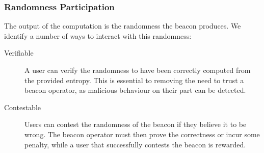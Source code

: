 \subsubsection{Randomness Participation}
The output of the computation is the randomness the beacon produces. We identify a number of ways to interact with this randomness:
\begin{description}
    \item [Verifiable] A user can verify the randomness to have been correctly computed from the provided entropy. This is essential to removing the need to trust a beacon operator, as malicious behaviour on their part can be detected. 
    \item [Contestable] Users can contest the randomness of the beacon if they believe it to be wrong. The beacon operator must then prove the correctness or incur some penalty, while a user that successfully contests the beacon is rewarded.  

\end{description}
